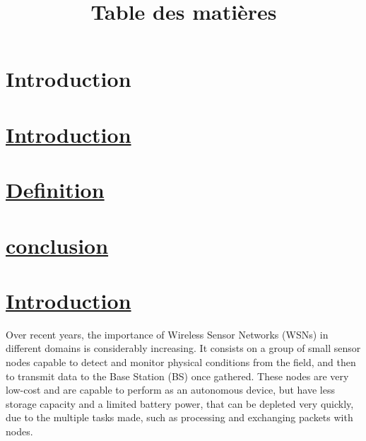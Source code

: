 \documentclass[12 pt]{article}
\begin{document}
\lhead{}
\chead{}
\rfoot{\thepage}
\renewcommand{\headrulewidth}{1pt}
\renewcommand{\footrulewidth}{1pt}


\title {Table des matières}
\maketitle

\section{Introduction}

\section{\underline{Introduction}}
\section{\underline{Definition}}
 \subsection{}
 \subsection{}
 
\section{\underline{conclusion}}

\newpage
\setcounter{section}{0}
\section{\underline{Introduction}}

\qquad
\flushright
Over recent years, the importance of Wireless Sensor
Networks (WSNs) in different domains is considerably
increasing. It consists on a group of small sensor nodes
capable to detect and monitor physical conditions from the
field, and then to transmit data to the Base Station (BS) once
gathered. These nodes are very low-cost and are capable to
perform as an autonomous device, but have less storage
capacity and a limited battery power, that can be depleted very
quickly, due to the multiple tasks made, such as processing
and exchanging packets with nodes.
\end{document}
